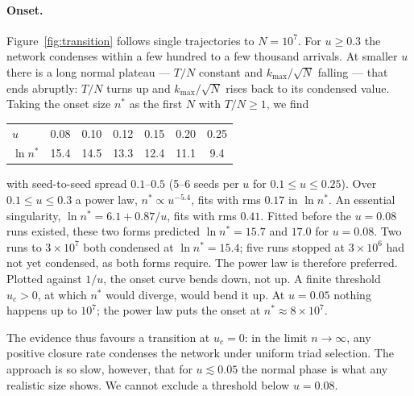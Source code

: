 \documentclass[aps,pre,twocolumn,superscriptaddress,floatfix,nofootinbib]{revtex4-2}
\begin{document}
\paragraph*{Onset.}
Figure~\ref{fig:transition} follows single trajectories to $N=10^7$. For
$u\ge0.3$ the network condenses within a few hundred to a few thousand
arrivals. At smaller $u$ there is a long normal plateau --- $T/N$ constant and
$k_{\max}/\sqrt N$ falling --- that ends abruptly: $T/N$ turns up and
$k_{\max}/\sqrt N$ rises back to its condensed value. Taking the onset size
$n^*$ as the first $N$ with $T/N\ge1$, we find
\begin{center}
\begin{tabular}{lcccccc}
$u$ & 0.08 & 0.10 & 0.12 & 0.15 & 0.20 & 0.25\\
$\ln n^*$ & 15.4 & 14.5 & 13.3 & 12.4 & 11.1 & 9.4\\
\end{tabular}
\end{center}
with seed-to-seed spread $0.1$--$0.5$ (5--6 seeds per $u$ for
$0.1\le u\le0.25$). Over $0.1\le u\le0.3$ a power law, $n^*\propto u^{-5.4}$,
fits with rms $0.17$ in $\ln n^*$. An essential singularity,
$\ln n^*=6.1+0.87/u$, fits with rms $0.41$. Fitted before the $u=0.08$ runs
existed, these two forms predicted $\ln n^*=15.7$ and $17.0$ for $u=0.08$. Two
runs to $3\times10^7$ both condensed at $\ln n^*=15.4$; five runs stopped at
$3\times10^6$ had not yet condensed, as both forms require. The power law is
therefore preferred. Plotted against $1/u$, the onset curve bends down, not
up. A finite threshold $u_c>0$,
at which $n^*$ would diverge, would bend it up. At $u=0.05$ nothing happens up
to $10^7$; the power law puts the onset at $n^*\approx8\times10^7$.

The evidence thus favours a transition at $u_c=0$: in the limit $n\to\infty$,
any positive closure rate condenses the network under uniform triad selection.
The approach is so slow, however, that for $u\lesssim0.05$ the normal phase is
what any realistic size shows. We cannot exclude a threshold below $u=0.08$.
\end{document}
